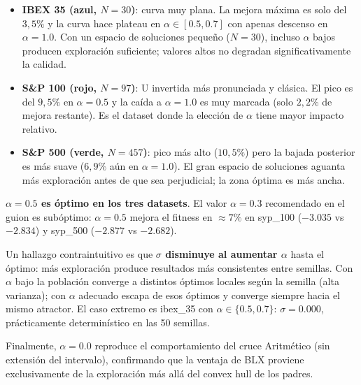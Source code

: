 \documentclass[12pt,a4paper]{article}
\begin{document}
\begin{itemize}
  \item \textbf{IBEX 35 (azul, $N=30$)}: curva muy plana. La mejora máxima es solo del
  $3{,}5\%$ y la curva hace plateau en $\alpha \in [0.5, 0.7]$ con apenas descenso en
  $\alpha=1.0$. Con un espacio de soluciones pequeño ($N=30$), incluso $\alpha$ bajos
  producen exploración suficiente; valores altos no degradan significativamente la calidad.

  \item \textbf{S\&P 100 (rojo, $N=97$)}: U invertida más pronunciada y clásica. El
  pico es del $9{,}5\%$ en $\alpha=0.5$ y la caída a $\alpha=1.0$ es muy marcada (solo
  $2{,}2\%$ de mejora restante). Es el dataset donde la elección de $\alpha$ tiene mayor
  impacto relativo.

  \item \textbf{S\&P 500 (verde, $N=457$)}: pico más alto ($10{,}5\%$) pero la
  bajada posterior es más suave ($6{,}9\%$ aún en $\alpha=1.0$). El gran espacio de
  soluciones aguanta más exploración antes de que sea perjudicial; la zona óptima es
  más ancha.
\end{itemize}

\textbf{$\alpha = 0.5$ es óptimo en los tres datasets}. El valor $\alpha = 0.3$
recomendado en el guion es subóptimo: $\alpha = 0.5$ mejora el fitness en
$\approx 7\%$ en syp\_100 ($-3.035$ vs $-2.834$) y syp\_500 ($-2.877$ vs $-2.682$).

Un hallazgo contraintuitivo es que \textbf{$\sigma$ disminuye al aumentar $\alpha$}
hasta el óptimo: más exploración produce resultados más consistentes entre semillas.
Con $\alpha$ bajo la población converge a distintos óptimos locales según la semilla
(alta varianza); con $\alpha$ adecuado escapa de esos óptimos y converge siempre
hacia el mismo atractor. El caso extremo es ibex\_35 con $\alpha\in\{0.5, 0.7\}$:
$\sigma=0.000$, prácticamente determinístico en las 50 semillas.

Finalmente, $\alpha=0.0$ reproduce el comportamiento del cruce Aritmético (sin
extensión del intervalo), confirmando que la ventaja de BLX proviene exclusivamente
de la exploración más allá del convex hull de los padres.

\end{document}
